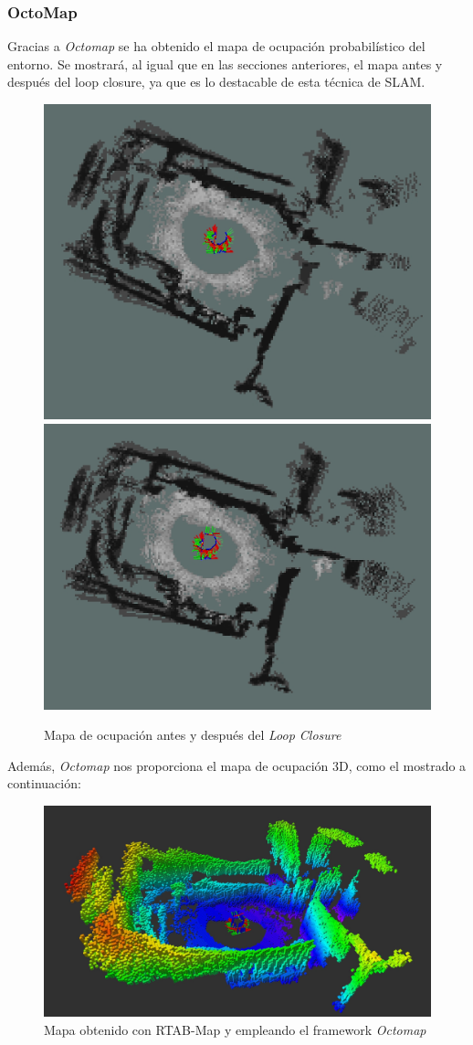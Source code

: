 \newpage
    \subsubsection{OctoMap}
Gracias a \textit{Octomap} se ha obtenido el mapa de ocupación probabilístico del entorno. Se mostrará, al igual que en las secciones anteriores, el mapa antes y después del loop closure, ya que es lo destacable de esta técnica de SLAM.
\begin{figure}[h!]
    \centering
    \includegraphics[width=.4\textwidth]{images/slam/bag3_occupGrid_noLC}
    \includegraphics[width=.435\textwidth]{images/slam/bag3_occupGrid_LC}
    \caption{Mapa de ocupación antes y después del \textit{Loop Closure}}
\end{figure}

Además, \textit{Octomap} nos proporciona el mapa de ocupación 3D, como el mostrado a continuación:
\begin{figure}[h!]
    \centering
    \includegraphics[width=.9\textwidth]{images/slam/bag3_octomap_LC}
    \caption{Mapa obtenido con RTAB-Map y empleando el framework \textit{Octomap}}
\end{figure}

